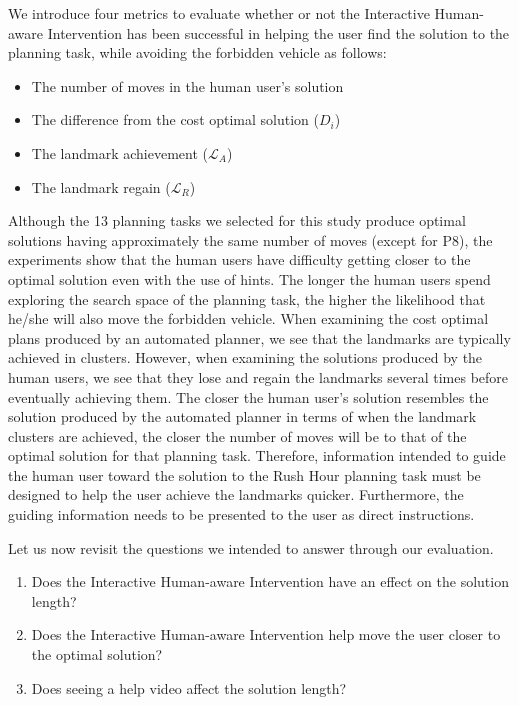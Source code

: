 We introduce four metrics to evaluate whether or not the Interactive Human-aware Intervention has been successful in helping the user find the solution to the planning task, while avoiding the forbidden vehicle as follows:
\begin{itemize}
\item The number of moves in the human user's solution
\item The difference from the cost optimal solution ($D_i$)
\item The landmark achievement ($\mathcal{L}_A$)
\item The landmark regain ($\mathcal{L}_R$)
\end{itemize}
Although the 13 planning tasks we selected for this study produce optimal solutions having approximately the same number of moves (except for P8), the experiments show that the human users have difficulty getting closer to the optimal solution even with the use of hints.
The longer the human users spend exploring the search space of the planning task, the higher the likelihood that he/she will also move the forbidden vehicle.
When examining the cost optimal plans produced by an automated planner, we see that the landmarks are typically achieved in clusters.
However, when examining the solutions produced by the human users, we see that they lose and regain the landmarks several times before eventually achieving them.
The closer the human user's solution resembles the solution produced by the automated planner in terms of when the landmark clusters are achieved, the closer the number of moves will be to that of the optimal solution for that planning task.
Therefore, information intended to guide the human user toward the solution to the Rush Hour planning task must be designed to help the user achieve the landmarks quicker.
Furthermore, the guiding information needs to be presented to the user as direct instructions.

Let us now revisit the questions we intended to answer through our evaluation.
\begin{enumerate}
\item Does the Interactive Human-aware Intervention have an effect on the solution length?
\item Does the Interactive Human-aware Intervention help move the user closer to the optimal solution?
\item Does seeing a help video affect the solution length?
\end{enumerate}

